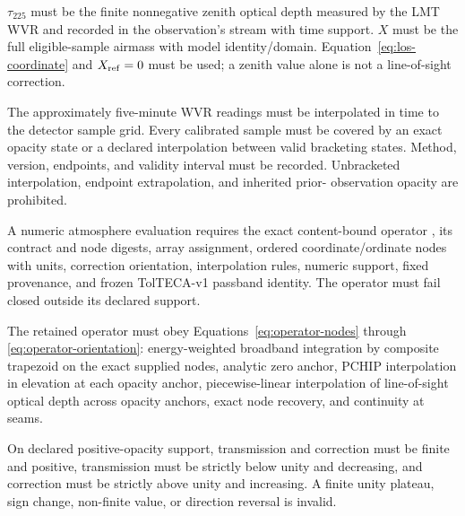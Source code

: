 \begin{description}[style=nextline]
\item[\Req{021}: opacity and airmass meaning.]
  \(\tau_{225}\) must be the finite nonnegative zenith optical depth measured
  by the LMT WVR and recorded in the observation's  stream with
  time support. \(X\) must be the full eligible-sample airmass with model
  identity/domain. Equation~\eqref{eq:los-coordinate} and
  \(X_{\rm ref}=0\) must be used; a zenith value alone is not a line-of-sight
  correction.

\item[\Req{022}: temporal support.]
  The approximately five-minute WVR readings must be interpolated in time to
  the detector sample grid. Every calibrated sample must be covered by an
  exact opacity state or a declared interpolation between valid bracketing
  states. Method, version, endpoints, and validity interval must be recorded.
  Unbracketed interpolation, endpoint extrapolation, and inherited prior-
  observation opacity are prohibited.

\item[\Req{023}: complete operator identity.]
  A numeric atmosphere evaluation requires the exact content-bound operator
  , its contract and node
  digests, array assignment, ordered coordinate/ordinate nodes with units,
  correction orientation, interpolation rules, numeric support, fixed
   provenance, and frozen TolTECA-v1 passband identity.
  The operator must fail closed outside its declared support.

\item[\Req{024}: structural evaluation.]
  The retained operator must obey Equations~\eqref{eq:operator-nodes} through
  \eqref{eq:operator-orientation}: energy-weighted broadband integration by
  composite trapezoid on the exact supplied nodes, analytic zero anchor,
  PCHIP interpolation in elevation at each opacity anchor, piecewise-linear
  interpolation of line-of-sight optical depth across opacity anchors, exact
  node recovery, and continuity at seams.

\item[\Req{025}: physical-direction invariants.]
  On declared positive-opacity support, transmission and correction must be
  finite and positive, transmission must be strictly below unity and
  decreasing, and correction must be strictly above unity and increasing.
  A finite unity plateau, sign change, non-finite value, or direction reversal
  is invalid.


\end{description}
